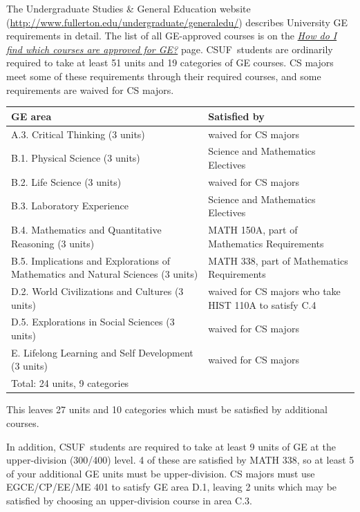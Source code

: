 \documentclass{book}
\newcommand{\campusname}{CSUF}
\begin{document}
\newcommand{\gecourselist}{ \href{http://www.fullerton.edu/undergraduate/generaledu/ge_approvedcourses.asp}{\emph{How do I find which courses are approved for GE?}} }

The Undergraduate Studies \& General Education website (\url{http://www.fullerton.edu/undergraduate/generaledu/}) describes University GE requirements in detail. The list of all GE-approved courses is on the \gecourselist page. \campusname~students are ordinarily required to take at least 51 units and 19 categories of GE courses. CS majors meet some of these requirements through their required courses, and some requirements are waived for CS majors.

\begin{center}
\begin{tabular}{| p{3in} | p{3in} |} \hline
  \textbf{GE area} & \textbf{Satisfied by} \\ \hline
  A.3. Critical Thinking (3 units) & waived for CS majors \\ \hline
  B.1. Physical Science (3 units) & Science and Mathematics Electives \\ \hline
  B.2. Life Science (3 units) & waived for CS majors \\ \hline
  B.3. Laboratory Experience & Science and Mathematics Electives \\ \hline
  B.4. Mathematics and Quantitative Reasoning (3 units) & MATH 150A, part of Mathematics Requirements \\ \hline
  B.5. Implications and Explorations of Mathematics and Natural Sciences (3 units) & MATH 338, part of Mathematics Requirements \\ \hline
  D.2. World Civilizations and Cultures (3 units) & waived for CS majors who take HIST 110A to satisfy C.4 \\ \hline
  D.5. Explorations in Social Sciences (3 units) & waived for CS majors \\ \hline
  E. Lifelong Learning and Self Development (3 units) & waived for CS majors \\ \hline
  \multicolumn{2}{|l|}{Total: 24 units, 9 categories} \\ \hline
\end{tabular}
\end{center}

This leaves 27 units and 10 categories which must be satisfied by additional courses.

In addition, \campusname~students are required to take at least 9 units of GE at the upper-division (300/400) level. 4 of these are satisfied by MATH 338, so at least 5 of your additional GE units must be upper-division. CS majors must use EGCE/CP/EE/ME 401 to satisfy GE area D.1, leaving 2 units which may be satisfied by choosing an upper-division course in area C.3.
\end{document}
